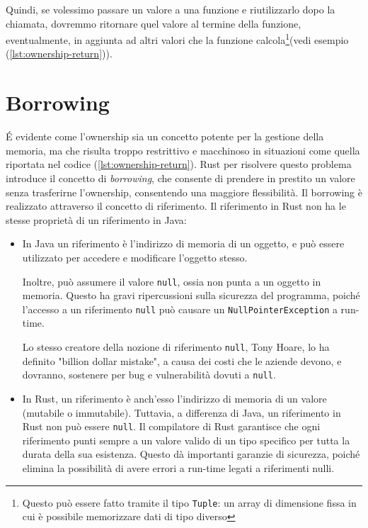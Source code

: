 Quindi, se volessimo passare un valore a una funzione e riutilizzarlo dopo la chiamata, dovremmo ritornare quel valore al termine della funzione, eventualmente, in aggiunta ad altri valori che la funzione calcola\footnote{Questo può essere fatto tramite il tipo \texttt{Tuple}: un array di dimensione fissa in cui è possibile memorizzare dati di tipo diverso}(vedi esempio (\ref{lst:ownership-return})). 

\section{Borrowing}
É evidente come l'ownership sia un concetto potente per la gestione della memoria, ma che risulta troppo restrittivo e macchinoso in situazioni come quella riportata nel codice (\ref{lst:ownership-return}). Rust per risolvere questo problema introduce il concetto di \textit{borrowing}, che consente di prendere in prestito un valore senza trasferirne l'ownership, consentendo una maggiore flessibilità. Il borrowing è realizzato attraverso il concetto di riferimento. Il riferimento in Rust non ha le stesse proprietà di un riferimento in Java: 
\begin{itemize}
    \item In Java un riferimento è l'indirizzo di memoria di un oggetto, e può essere utilizzato per accedere e modificare l'oggetto stesso. 
    
    Inoltre, può assumere il valore \texttt{null}, ossia non punta a un oggetto in memoria. Questo ha gravi ripercussioni sulla sicurezza del programma, poiché l'accesso a un riferimento \texttt{null} può causare un \texttt{NullPointerException} a run-time. 
    
    Lo stesso creatore della nozione di riferimento \texttt{null}, Tony Hoare, lo ha definito "billion dollar mistake"\cite{hoare-null-reference}, a causa dei costi che le aziende devono, e dovranno, sostenere per bug e vulnerabilità dovuti a \texttt{null}.
    \item In Rust, un riferimento è anch'esso l'indirizzo di memoria di un valore (mutabile o immutabile). Tuttavia, a differenza di Java, un riferimento in Rust non può essere \texttt{null}. Il compilatore di Rust garantisce che ogni riferimento punti sempre a un valore valido di un tipo specifico per tutta la durata della sua esistenza. Questo dà importanti garanzie di sicurezza, poiché elimina la possibilità di avere errori a run-time legati a riferimenti nulli.
\end{itemize}
